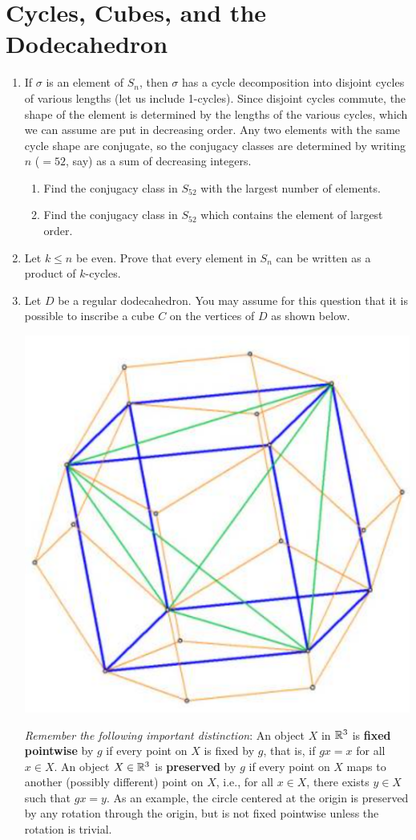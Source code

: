 \documentclass[../psets.tex]{subfiles}
\begin{document}
\section{Cycles, Cubes, and the Dodecahedron}
\begin{enumerate}
    \item {}If $\sigma$ is an element of $S_n$, then $\sigma$ has a cycle decomposition into disjoint cycles of various lengths (let us include 1-cycles). Since disjoint cycles commute, the shape of the element is determined by the lengths of the various cycles, which we can assume are put in decreasing order. Any two elements with the same cycle shape are conjugate, so the conjugacy classes are determined by writing $n$ ($=52$, say) as a sum of decreasing integers.
    \begin{enumerate}
        \item Find the conjugacy class in $S_{52}$ with the largest number of elements.
        \item Find the conjugacy class in $S_{52}$ which contains the element of largest order.
    \end{enumerate}
    \item Let $k\leq n$ be even. Prove that every element in $S_n$ can be written as a product of $k$-cycles.
    \item Let $D$ be a regular dodecahedron. You may assume for this question that it is possible to inscribe a cube $C$ on the vertices of $D$ as shown below.
    \begin{center}
        \includegraphics[width=0.4\linewidth]{../ExtFiles/dodecahedronCube.png}
    \end{center}
    \emph{Remember the following important distinction}: An object $X$ in $\mathbb{R}^3$ is \textbf{fixed pointwise} by $g$ if every point on $X$ is fixed by $g$, that is, if $gx=x$ for all $x\in X$. An object $X\in\mathbb{R}^3$ is \textbf{preserved} by $g$ if every point on $X$ maps to another (possibly different) point on $X$, i.e., for all $x\in X$, there exists $y\in X$ such that $gx=y$. As an example, the circle centered at the origin is preserved by any rotation through the origin, but is not fixed pointwise unless the rotation is trivial.

\end{enumerate}
\end{document}
